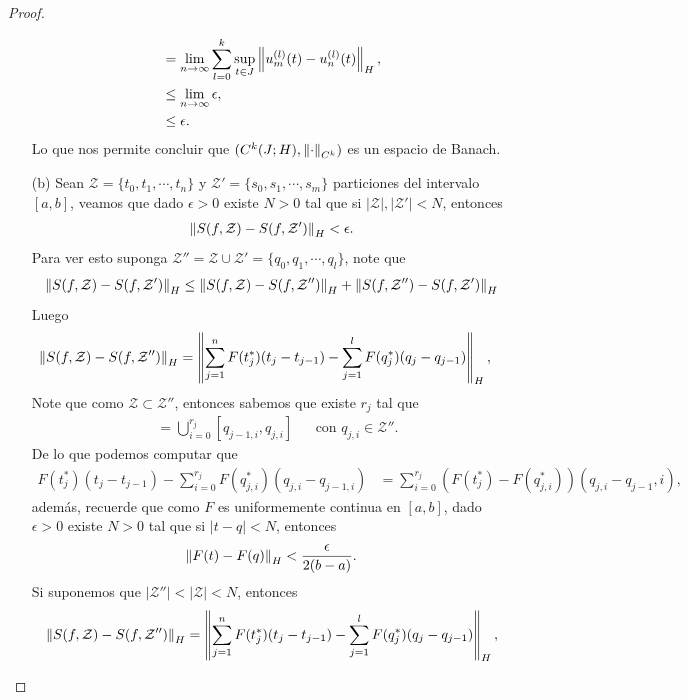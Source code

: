 \begin{proof}
\begin{enumerate}
\begin{align*}
        &=\lim_{n \to \infty}\sum_{l=0}^{k}\sup_{t\in J}\left\|u_{m}^{(l)}(t)-u_{n}^{(l)}(t)\right\|_{H},\\
        &\leq\lim_{n \to \infty}\epsilon,\\
        &\leq \epsilon.
      \end{align*}
      Lo que nos permite concluir que $(C^{k}(J;H),\left\|\cdot\right\|_{C^{k}})$ es un espacio de Banach.
    \item[(b)] Sean $\mathcal{Z}=\{t_0,t_{1},\cdots,t_{n}\}$ y $\mathcal{Z}'=\{s_0,s_{1},\cdots,s_{m}\}$ particiones del intervalo $[a,b]$, veamos que dado $\epsilon>0$ existe $N>0$ tal que si $|\mathcal{Z}|,|\mathcal{Z}'|< N$, entonces 
    \begin{align*}
      \left\|S(f,\mathcal{Z})-S(f,\mathcal{Z}')\right\|_{H}<\epsilon. 
    \end{align*}
    Para ver esto suponga $\mathcal{Z}''=\mathcal{Z}\cup\mathcal{Z}'=\{q_{0},q_{1},\cdots,q_{l}\}$, note que
    \begin{align*}
      \left\|S(f,\mathcal{Z})-S(f,\mathcal{Z}')\right\|_{H}\leq\left\|S(f,\mathcal{Z})-S(f,\mathcal{Z}'')\right\|_{H}+\left\|S(f,\mathcal{Z''})-S(f,\mathcal{Z}')\right\|_{H}
    \end{align*}
    Luego
    \begin{align*}
      \left\|S(f,\mathcal{Z})-S(f,\mathcal{Z''})\right\|_{H}&=\left\|\sum_{j=1}^{n}F(t^{*}_{j})(t_{j}-t_{j-1})-\sum_{j=1}^{l}F(q^{*}_{j})(q_{j}-q_{j-1})\right\|_{H},
    \end{align*}
    Note que como $\mathcal{Z}\subset \mathcal{Z}''$, entonces sabemos que existe $r_{j}$ tal que
    \begin{align*}
      [t_{j-1},t_{j}]&=\bigcup_{i=0}^{r_{j}} [q_{j-1,i},q_{j,i}] &&\text{con $q_{j,i}\in \mathcal{Z}''$.}
    \end{align*}
    De lo que podemos computar que
    \begin{align*}
      F(t^{*}_{j})(t_{j}-t_{j-1})-\sum_{i=0}^{r_{j}}F(q^*_{j,i})(q_{j,i}-q_{j-1,i})&=\sum_{i=0}^{r_{j}}(F(t^*_{j})-F(q^*_{j,i}))(q_{j,i}-q_{j-1},i),
    \end{align*}
    además, recuerde que como $F$ es uniformemente continua en $[a,b]$, dado $\epsilon>0$ existe $N>0$ tal que si $|t-q|<N$, entonces
    \begin{align*}
      \left\|F(t)-F(q)\right\|_{H}< \frac{\epsilon}{2(b-a)}. 
    \end{align*}
    Si suponemos que $|\mathcal{Z}''|<|\mathcal{Z}|<N$, entonces
    \begin{align*}
      \norm{S(f,\mathcal{Z})-S(f,\mathcal{Z''})}_{H}&=\norm{\sum_{j=1}^{n}F(t_{j}^{*})(t_{j}-t_{j-1})-\sum_{j=1}^{l}F(q^{*}_{j})(q_{j}-q_{j-1})}_{H},\\

\end{align*}
\end{enumerate}
\end{proof}
